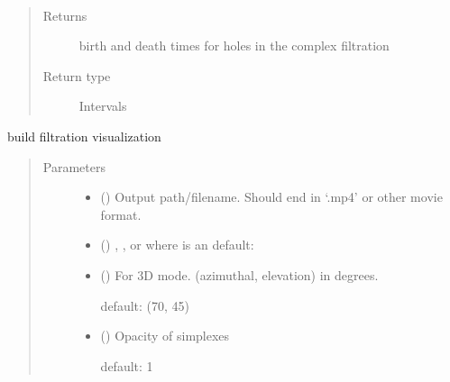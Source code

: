 \documentclass[letterpaper,10pt,openany,oneside,english]{sphinxmanual}
\begin{document}
\begin{fulllineitems}
\begin{fulllineitems}
\label{\detokenize{phomology:phomology.Filtration.intervals}}~\begin{quote}\begin{description}
\item[{Returns}] \leavevmode
birth and death times for holes in the complex filtration

\item[{Return type}] \leavevmode
Intervals

\end{description}\end{quote}

\end{fulllineitems}


\begin{fulllineitems}
\label{\detokenize{phomology:phomology.Filtration.movie}}
build filtration visualization
\begin{quote}\begin{description}
\item[{Parameters}] \leavevmode\begin{itemize}
\item {} 
 () \textendash{} Output path/filename. Should end in ‘.mp4’ or other movie format.

\item {} 
 (\sphinxstyleliteralemphasis{, }) \textendash{} , , or
 where  is an 
default: 

\item {} 
 () \textendash{} 
For 3D mode. (azimuthal, elevation) in degrees.

default: (70, 45)


\item {} 
 () \textendash{} 
Opacity of simplexes

default: 1



\end{itemize}
\end{description}
\end{quote}
\end{fulllineitems}
\end{fulllineitems}
\end{document}
